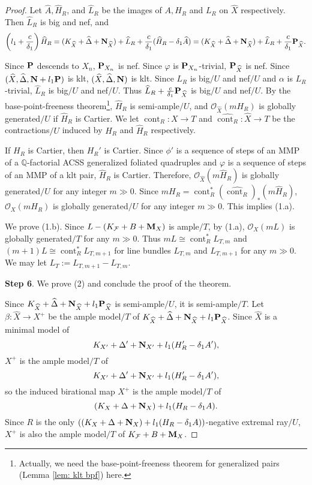 \documentclass[11pt]{amsart}
\numberwithin{equation}{section}
\newcommand{\Mm}{{\bf{M}}}
\newcommand{\Nn}{{\bf{N}}}
\newcommand{\Pp}{{\bf{P}}}
\newcommand{\Qq}{\mathbb{Q}}
\newcommand{\cont}{\operatorname{cont}}
\newcommand{\Ff}{\mathcal{F}}
\theoremstyle{definition}
\theoremstyle{definition}
\theoremstyle{definition}
\begin{document}
\begin{proof}
Let $\widehat A, \widehat H_R$, and $\widehat L_R$ be the images of $A, H_R$ and $L_R$ on $\widehat X$ respectively. Then $\widehat L_R$ is big and nef, and
$$\left(l_1+\frac{c}{\delta_1}\right)\widehat H_R=(K_{\widehat X}+\widehat\Delta+\Nn_{\widehat X})+\widehat L_R+\frac{c}{\delta_1}(\widehat H_R-\delta_1\widehat A)=(K_{\widehat X}+\widehat\Delta+\Nn_{\widehat X})+\widehat L_R+\frac{c}{\delta_1}\Pp_{\widehat X}.$$

Since $\Pp$ descends to $X_n$, $\Pp_{X_n}$ is nef. Since $\varphi$ is $\Pp_{X_n}$-trivial, $\Pp_{\widehat X}$ is nef. Since $(\widehat X,\widehat\Delta,\Nn+l_1\Pp)$ is klt, $(\widehat X,\widehat\Delta,\Nn)$ is klt. Since $L_R$ is big$/U$ and nef$/U$ and $\alpha$ is $L_R$-trivial, $\widehat L_R$ is  big$/U$ and nef$/U$. Thus $\widehat L_R+\frac{c}{\delta_1}\Pp_{\widehat X}$ is big$/U$ and nef$/U$. By the base-point-freeness theorem\footnote{Actually, we need the base-point-freeness theorem for generalized pairs (Lemma \ref{lem: klt bpf}) here.}, $\widehat H_R$ is semi-ample$/U$, and $\mathcal{O}_{\widehat X}(mH_R)$ is globally generated$/U$ if $\widehat H_R$ is Cartier. We let $\cont_R: X\rightarrow T$ and $\widehat{\cont_R}: \widehat X\rightarrow T$ be the contractions$/U$ induced by $H_R$ and $\widehat H_R$ respectively. 

If $H_R$ is Cartier, then $H_R'$ is Cartier. Since $\phi'$ is a sequence of steps of an MMP of a $\Qq$-factorial ACSS generalized foliated quadruples and $\varphi$ is a sequence of steps of an MMP of a klt pair, $\widehat H_R$ is Cartier. Therefore, $\mathcal{O}_{\widehat X}(m\widehat H_R)$ is globally generated$/U$ for any integer $m\gg 0$. Since $mH_R=\cont_R^*(\widehat{\cont_R})_*(m\widehat H_R)$, $\mathcal{O}_{X}(mH_R)$ is globally generated$/U$ for any integer $m\gg 0$. This implies (1.a).

We prove (1.b). Since $L-(K_{\Ff}+B+\Mm_X)$ is ample$/T$, by (1.a), $\mathcal{O}_X(mL)$ is globally generated$/T$ for any $m\gg 0$. Thus $mL\cong\cont_R^*L_{T,m}$ and  $(m+1)L\cong\cont_R^*L_{T,m+1}$ for line bundles $L_{T,m}$ and $L_{T,m+1}$ for any $m\gg 0$. We may let $L_T:=L_{T,m+1}-L_{T,m}$.

\medskip

\noindent\textbf{Step 6}. We prove (2) and conclude the proof of the theorem.


Since $K_{\widehat X}+\widehat\Delta+\Nn_{\widehat X}+l_1\Pp_{\widehat X}$ is semi-ample$/U$, it is semi-ample$/T$. Let $\beta: \widehat X\rightarrow X^+$ be the ample model$/T$ of $K_{\widehat X}+\widehat\Delta+\Nn_{\widehat X}+l_1\Pp_{\widehat X}$. Since $\widehat X$ is a minimal model of $$K_{X'}+\Delta'+\Nn_{X'}+l_1(H_R'-\delta_1A'),$$ $X^+$ is the ample model$/T$ of
$$K_{X'}+\Delta'+\Nn_{X'}+l_1(H_R'-\delta_1A'),$$
so the induced birational map $X^+$ is the ample model$/T$ of 
$$(K_X+\Delta+\Nn_X)+l_1(H_R-\delta_1A).$$
Since $R$ is the only $((K_X+\Delta+\Nn_X)+l_1(H_R-\delta_1A))$-negative extremal ray$/U$, $X^+$ is also the ample model$/T$ of $K_{\Ff}+B+\Mm_X$.


\end{proof}
\end{document}

